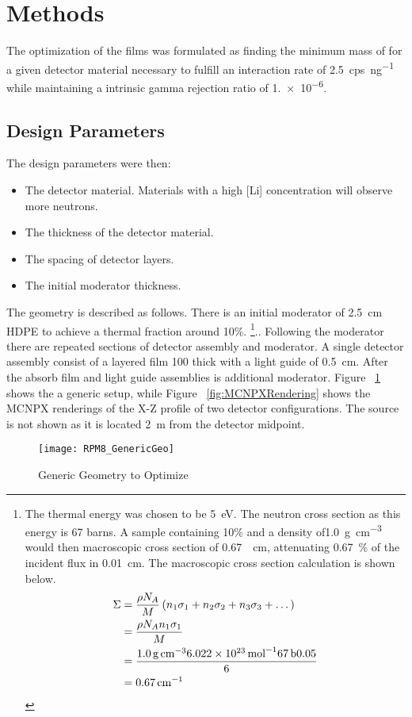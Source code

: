 \section{Methods}
\label{sec:Methodes}


The optimization of the films was formulated as finding the minimum mass of  for a given detector material necessary to fulfill an interaction rate of \SI{2.5}{cps\per\nano\gram{}} while maintaining a intrinsic gamma rejection ratio of \num{1.e-6}.

\subsection{Design Parameters}
\label{sec:DesignParameters}
The design parameters were then:
\begin{itemize}
  \item The detector material. Materials with a high [Li] concentration will observe more neutrons.
  \item The thickness of the detector material.
  \item The spacing of detector layers.
  \item The initial moderator thickness.
\end{itemize}

The geometry is described as follows.
There is an initial moderator of \SI{2.5}{\centi \meter} HDPE to achieve a thermal fraction around 10\%.
\footnote{The thermal energy was chosen to be \SI{5}{\electronvolt}. 
The  neutron cross section as this energy is 67 barns. 
A sample containing 10\%  and a density of\SI{1.0}{\gram \per \cubic \centi\meter} would then macroscopic cross section of \SI{0.67}{\per \centi\meter}, attenuating \SI{0.67}{\percent} of the incident flux in \SI{0.01}{ \centi\meter}. 
The macroscopic cross section calculation is shown below. 
\begin{align*}
\Sigma &= \frac{\rho N_A}{M}  \left ( n_1 \sigma_1 + n_2 \sigma_2 + n_3 \sigma_3 + \dots  \right ) \\ 
       &= \frac{\rho N_A n_1 \sigma_1}{M} \\
       &= \frac{\SI{1.0}{\gram\per\cubic\centi\meter} \SI{6.022E23}{\per\mole} \SI{67}{\barn}{0.05}}{6} \\
       &= \SI{0.67}{\per\centi\meter} 
\end{align*}
}..
Following the moderator there are repeated sections of detector assembly and moderator. A single detector assembly consist of a layered film \SI{100}{\micron} thick with a light guide of \SI{0.5}{\centi\meter}.
After the absorb film and light guide assemblies is additional moderator.
Figure ~\ref{fig:GenericDetector} shows the a generic setup, while Figure ~\ref{fig:MCNPXRendering} shows the MCNPX renderings of the X-Z profile of two detector configurations.
The source is not shown as it is located \SI{2}{\meter} from the detector midpoint.
\begin{figure}
   \texttt{[image: RPM8\_GenericGeo]}
   \caption{Generic Geometry to Optimize}
   \label{fig:GenericDetector}
\end{figure}

